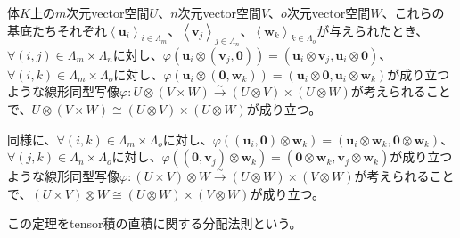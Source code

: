 \documentclass[dvipdfmx]{jsarticle}
\begin{document}
\begin{thm}[tensor積の直積に関する分配法則]\label{2.4.9.7}
体$K$上の$m$次元vector空間$U$、$n$次元vector空間$V$、$o$次元vector空間$W$、これらの基底たちそれぞれ$\left\langle \mathbf{u}_{i} \right\rangle_{i \in \varLambda_{m}}$、$\left\langle \mathbf{v}_{j} \right\rangle_{j \in \varLambda_{n}}$、$\left\langle \mathbf{w}_{k} \right\rangle_{k \in \varLambda_{o}}$が与えられたとき、$\forall(i,j) \in \varLambda_{m} \times \varLambda_{n}$に対し、$\varphi\left( \mathbf{u}_{i} \otimes \left( \mathbf{v}_{j},\mathbf{0} \right) \right) = \left( \mathbf{u}_{i} \otimes \mathbf{v}_{j},\mathbf{u}_{i} \otimes \mathbf{0} \right)$、$\forall(i,k) \in \varLambda_{m} \times \varLambda_{o}$に対し、$\varphi\left( \mathbf{u}_{i} \otimes \left( \mathbf{0},\mathbf{w}_{k} \right) \right) = \left( \mathbf{u}_{i} \otimes \mathbf{0},\mathbf{u}_{i} \otimes \mathbf{w}_{k} \right)$が成り立つような線形同型写像$\varphi:U \otimes (V \times W)\overset{\sim}{\rightarrow}(U \otimes V) \times (U \otimes W)$が考えられることで、$U \otimes (V \times W) \cong (U \otimes V) \times (U \otimes W)$が成り立つ。\par
同様に、$\forall(i,k) \in \varLambda_{m} \times \varLambda_{o}$に対し、$\varphi\left( \left( \mathbf{u}_{i},\mathbf{0} \right) \otimes \mathbf{w}_{k} \right) = \left( \mathbf{u}_{i} \otimes \mathbf{w}_{k},\mathbf{0} \otimes \mathbf{w}_{k} \right)$、$\forall(j,k) \in \varLambda_{n} \times \varLambda_{o}$に対し、$\varphi\left( \left( \mathbf{0},\mathbf{v}_{j} \right) \otimes \mathbf{w}_{k} \right) = \left( \mathbf{0} \otimes \mathbf{w}_{k},\mathbf{v}_{j} \otimes \mathbf{w}_{k} \right)$が成り立つような線形同型写像$\varphi:(U \times V) \otimes W\overset{\sim}{\rightarrow}(U \otimes W) \times (V \otimes W)$が考えられることで、$(U \times V) \otimes W \cong (U \otimes W) \times (V \otimes W)$が成り立つ。\par
この定理をtensor積の直積に関する分配法則という。
\end{thm}
\end{document}
